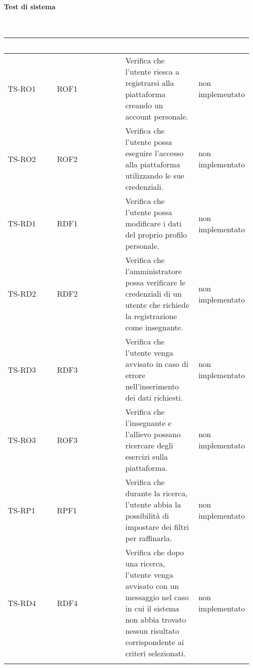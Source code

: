 \paragraph{Test di sistema}\textcolor{white}{4}
{\renewcommand{\arraystretch}{2}%
\begin{longtable}{|>{\centering\arraybackslash}m{1.6cm}|>{\centering\arraybackslash}m{1.7cm}|m{6.41cm}|>{\centering\arraybackslash}m{3.1cm}|}		
	\rowcolor{LightBlue}
		\textbf{\textcolor{white}{Codice\newline test}}
		& \textbf{\textcolor{white}{Codice\newline requisito}}
		& \multicolumn{1}{|c|}{\textbf{\textcolor{white}{ Descrizione}}}
		& \textbf{\textcolor{white}{Stato}}\\

		\hline
		\rowcolor{LightGray}
		TS-RO1
		& ROF1 
		& Verifica che l'utente riesca a registrarsi alla piattaforma creando un account personale. 
		& non implementato\\ \hline
		\rowcolor{white}
		TS-RO2
		& ROF2 
		& Verifica che l'utente possa eseguire l'accesso alla piattaforma utilizzando le sue credenziali.
		& non implementato\\ \hline
		\rowcolor{LightGray}
		TS-RD1
		& RDF1 
		& Verifica che l'utente possa modificare i dati del proprio profilo personale.
		& non implementato\\ \hline
		\rowcolor{white}
		TS-RD2
		& RDF2 
		& Verifica che l'amministratore possa verificare le credenziali di un utente che richiede la registrazione come insegnante. 
		& non implementato\\ \hline
		\rowcolor{LightGray}
		TS-RD3
		& RDF3 
		& Verifica che l'utente venga avvisato in caso di errore nell'inserimento dei dati richiesti.
		& non implementato\\ \hline
		\rowcolor{white}
		TS-RO3		
		& ROF3 
		& Verifica che l'insegnante e l'allievo possano ricercare degli esercizi sulla piattaforma.
		& non implementato\\ \hline
		\rowcolor{LightGray}
		TS-RP1		
		& RPF1 
		& Verifica che durante la ricerca, l'utente abbia la possibilità di impostare dei filtri per raffinarla. 		
		& non implementato\\ \hline
		\rowcolor{white}
		TS-RD4		
		& RDF4 
		& Verifica che dopo una ricerca, l'utente venga avvisato con un messaggio nel caso in cui il sistema non abbia trovato nessun risultato corrispondente ai criteri selezionati.
		& non implementato\\ \hline
		\rowcolor{LightGray}

\end{longtable}}
